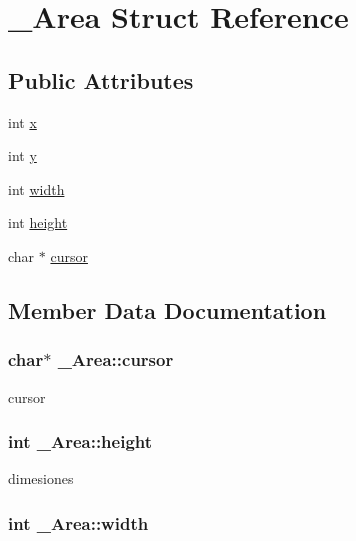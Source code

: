 \hypertarget{struct__Area}{}\section{\+\_\+\+Area Struct Reference}
\label{struct__Area}
\subsection*{Public Attributes}
\begin{DoxyCompactItemize}
\item 
int \hyperlink{struct__Area_a093b8c2929094bac88bbf5ee7db85573}{x}
\item 
int \hyperlink{struct__Area_a867e601f05480db03237c3a17d4c77f8}{y}
\item 
int \hyperlink{struct__Area_aa2f753fc3d254821603ac4512db814f1}{width}
\item 
int \hyperlink{struct__Area_a22627de8e529d631c17157f1f68cb5ac}{height}
\item 
char $\ast$ \hyperlink{struct__Area_aa042b0549789b75fd133b67ad7d0fd9d}{cursor}
\end{DoxyCompactItemize}


\subsection{Member Data Documentation}
\subsubsection[{\texorpdfstring{cursor}{cursor}}]{\setlength{\rightskip}{0pt plus 5cm}char$\ast$ \+\_\+\+Area\+::cursor}\hypertarget{struct__Area_aa042b0549789b75fd133b67ad7d0fd9d}{}\label{struct__Area_aa042b0549789b75fd133b67ad7d0fd9d}
cursor 
\subsubsection[{\texorpdfstring{height}{height}}]{\setlength{\rightskip}{0pt plus 5cm}int \+\_\+\+Area\+::height}\hypertarget{struct__Area_a22627de8e529d631c17157f1f68cb5ac}{}\label{struct__Area_a22627de8e529d631c17157f1f68cb5ac}
dimesiones 
\subsubsection[{\texorpdfstring{width}{width}}]{\setlength{\rightskip}{0pt plus 5cm}int \+\_\+\+Area\+::width}\hypertarget{struct__Area_aa2f753fc3d254821603ac4512db814f1}{}\label{struct__Area_aa2f753fc3d254821603ac4512db814f1}
